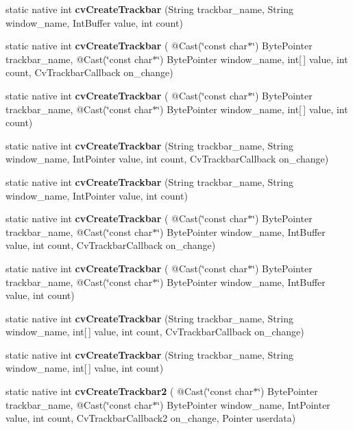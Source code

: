\begin{DoxyCompactItemize}
\item 
static native int {\bfseries cv\+Create\+Trackbar} (String trackbar\+\_\+name, String window\+\_\+name, Int\+Buffer value, int count)
\item 
static native int {\bfseries cv\+Create\+Trackbar} ( @Cast(\char`\"{}const char$\ast$\char`\"{}) Byte\+Pointer trackbar\+\_\+name, @Cast(\char`\"{}const char$\ast$\char`\"{}) Byte\+Pointer window\+\_\+name, int\mbox{[}$\,$\mbox{]} value, int count, Cv\+Trackbar\+Callback on\+\_\+change)
\item 
static native int {\bfseries cv\+Create\+Trackbar} ( @Cast(\char`\"{}const char$\ast$\char`\"{}) Byte\+Pointer trackbar\+\_\+name, @Cast(\char`\"{}const char$\ast$\char`\"{}) Byte\+Pointer window\+\_\+name, int\mbox{[}$\,$\mbox{]} value, int count)
\item 
static native int {\bfseries cv\+Create\+Trackbar} (String trackbar\+\_\+name, String window\+\_\+name, Int\+Pointer value, int count, Cv\+Trackbar\+Callback on\+\_\+change)
\item 
static native int {\bfseries cv\+Create\+Trackbar} (String trackbar\+\_\+name, String window\+\_\+name, Int\+Pointer value, int count)
\item 
static native int {\bfseries cv\+Create\+Trackbar} ( @Cast(\char`\"{}const char$\ast$\char`\"{}) Byte\+Pointer trackbar\+\_\+name, @Cast(\char`\"{}const char$\ast$\char`\"{}) Byte\+Pointer window\+\_\+name, Int\+Buffer value, int count, Cv\+Trackbar\+Callback on\+\_\+change)
\item 
static native int {\bfseries cv\+Create\+Trackbar} ( @Cast(\char`\"{}const char$\ast$\char`\"{}) Byte\+Pointer trackbar\+\_\+name, @Cast(\char`\"{}const char$\ast$\char`\"{}) Byte\+Pointer window\+\_\+name, Int\+Buffer value, int count)
\item 
static native int {\bfseries cv\+Create\+Trackbar} (String trackbar\+\_\+name, String window\+\_\+name, int\mbox{[}$\,$\mbox{]} value, int count, Cv\+Trackbar\+Callback on\+\_\+change)
\item 
static native int {\bfseries cv\+Create\+Trackbar} (String trackbar\+\_\+name, String window\+\_\+name, int\mbox{[}$\,$\mbox{]} value, int count)
\item 
static native int {\bfseries cv\+Create\+Trackbar2} ( @Cast(\char`\"{}const char$\ast$\char`\"{}) Byte\+Pointer trackbar\+\_\+name, @Cast(\char`\"{}const char$\ast$\char`\"{}) Byte\+Pointer window\+\_\+name, Int\+Pointer value, int count, Cv\+Trackbar\+Callback2 on\+\_\+change, Pointer userdata)
\item 

\end{DoxyCompactItemize}
